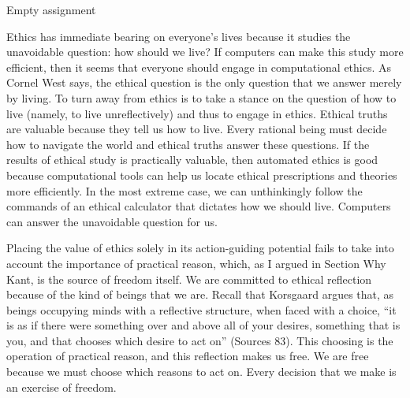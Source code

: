 \begin{isabellebody}
{  Empty assignment
\color{black}%
}%
\endisatagproof
{\isafoldproof}%
%
\isadelimproof
%
\endisadelimproof
%
\isadelimdocument
%
\endisadelimdocument
%
\isatagdocument
%
\isamarkuptrue%
%
\isamarkuptrue%
%
\endisatagdocument
{\isafolddocument}%
%
\isadelimdocument
%
\endisadelimdocument
%
\begin{isamarkuptext}%
Ethics has immediate bearing on everyone’s lives because it studies the unavoidable question: 
how should we live? If computers can make this study more efficient, then it seems that everyone should
engage in computational ethics. As Cornel West says, the ethical question is the only question that 
we answer merely by living. To turn away from ethics is to take a stance on the question of how to 
live (namely, to live unreflectively) and thus to engage in ethics. Ethical truths are valuable because 
they tell us how to live. Every rational being must decide how to navigate the world and ethical 
truths answer these questions. If the results of ethical study is practically valuable, then automated 
ethics is good because computational tools can help us locate ethical prescriptions and theories more efficiently. 
In the most extreme case, we can unthinkingly follow the commands of an ethical calculator that dictates 
how we should live. Computers can answer the unavoidable question for us.

Placing the value of ethics solely in its action-guiding potential fails to take into account the 
importance of practical reason, which, as I argued in Section Why Kant, is the source
of freedom itself. 
We are committed to ethical reflection because of the kind of beings that we are. Recall that Korsgaard 
argues that, as beings occupying minds with a reflective structure, when faced with a choice, “it is as if there 
were something over and above all of your desires, something that is you, and that chooses which desire 
to act on” (Sources 83). This choosing is the operation of practical reason, and this reflection
makes us free. We are free because we must choose which reasons to act on. Every decision that we 
make is an exercise of freedom. 


\end{isamarkuptext}
\end{isabellebody}
